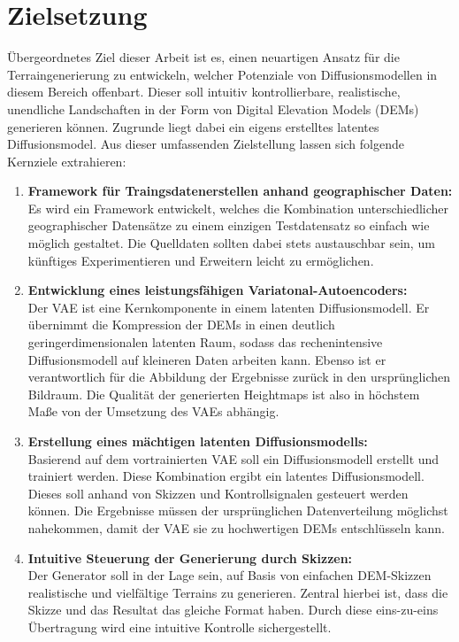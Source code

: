 \section{Zielsetzung}
\label{sec:Zielsetzung}

Übergeordnetes Ziel dieser Arbeit ist es, einen neuartigen Ansatz für die Terraingenerierung zu entwickeln, welcher Potenziale von Diffusionsmodellen in diesem Bereich offenbart. Dieser soll intuitiv kontrollierbare, realistische, unendliche Landschaften in der Form von Digital Elevation Models (DEMs)  generieren können. Zugrunde liegt dabei ein eigens erstelltes latentes Diffusionsmodel. Aus dieser umfassenden Zielstellung lassen sich folgende Kernziele extrahieren:

\begin{enumerate}
    \item \textbf {Framework für Traingsdatenerstellen anhand geographischer Daten:} \\
    Es wird ein Framework entwickelt, welches die Kombination unterschiedlicher geographischer Datensätze zu einem einzigen Testdatensatz so einfach wie möglich gestaltet. Die Quelldaten sollten dabei stets austauschbar sein, um künftiges Experimentieren und Erweitern leicht zu ermöglichen.

    \item \textbf {Entwicklung eines leistungsfähigen Variatonal-Autoencoders:} \\
    Der \ac{VAE} ist eine Kernkomponente in einem latenten Diffusionsmodell. Er übernimmt die Kompression der \ac{DEM}s in einen deutlich geringerdimensionalen latenten Raum, sodass das rechenintensive Diffusionsmodell auf kleineren Daten arbeiten kann. Ebenso ist er verantwortlich für die Abbildung der Ergebnisse zurück in den ursprünglichen Bildraum. Die Qualität der generierten Heightmaps ist also in höchstem Maße von der Umsetzung des \ac{VAE}s abhängig.

    \item \textbf {Erstellung eines mächtigen latenten Diffusionsmodells:} \\
    Basierend auf dem vortrainierten \ac{VAE} soll ein Diffusionsmodell erstellt und trainiert werden. Diese Kombination ergibt ein latentes Diffusionsmodell. Dieses soll anhand von Skizzen und Kontrollsignalen gesteuert werden können. Die Ergebnisse müssen der ursprünglichen Datenverteilung möglichst nahekommen, damit der \ac{VAE} sie zu hochwertigen \ac{DEM}s entschlüsseln kann.
    
    \item \textbf {Intuitive Steuerung der Generierung durch Skizzen:} \\
    Der Generator soll in der Lage sein, auf Basis von einfachen \ac{DEM}-Skizzen realistische und vielfältige Terrains zu generieren. Zentral hierbei ist, dass die Skizze und das Resultat das gleiche Format haben. Durch diese eins-zu-eins Übertragung wird eine intuitive Kontrolle sichergestellt.


\end{enumerate}
